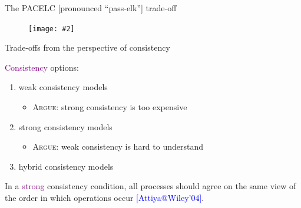 \documentclass{beamer}
\makeatletter
\newcommand{\citeinbeamer}[3]{{\scriptsize{\textcolor{blue}{[#1@#2'#3]}}}}
\newcommand{\fignocaption}[2]
{
  \begin{figure}[htp]
    \centering
      \texttt{[image: \#2]}
  \end{figure}
}
\newcommand{\largepurple}[1]{\textcolor{purple}{\large #1}}
\makeatother
\begin{document}
\begin{frame}{The PACELC [pronounced ``pass-elk''] trade-off}
  \begin{definition}[The \largepurple{PACELC} trade-off
  \citeinbeamer{Abadi}{IEEE Computer}{12}]
    \fignocaption{width = 0.40\textwidth}{fig/PACELC-tradeoff.pdf}

  \end{definition}
\end{frame}
\begin{frame}{Trade-offs from the perspective of consistency}

  \largepurple{Consistency} options:
  \begin{enumerate}
    \item weak consistency models
      \begin{itemize}
        \item \textsc{Argue}: strong consistency is too expensive
      \end{itemize}
    \item strong consistency models
      \begin{itemize}
        \item \textsc{Argue}: weak consistency is hard to understand
      \end{itemize}
    \item hybrid consistency models
  \end{enumerate}

  \begin{definition}
    In a \largepurple{strong} consistency condition, all processes should agree
    on the same view of the order in which operations occur
    \citeinbeamer{Attiya}{Wiley}{04}.
  \end{definition}
\end{frame}
\end{document}
